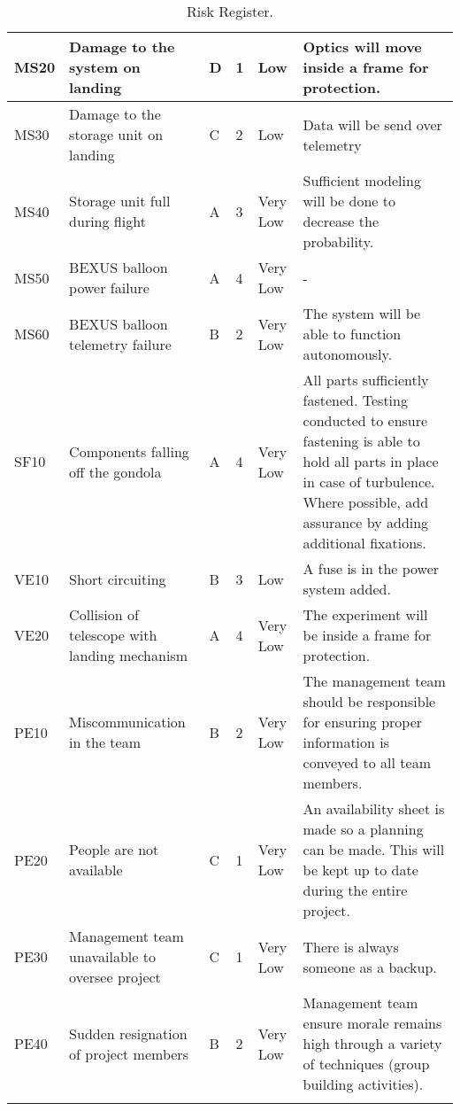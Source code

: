 \begin{longtable}{|m{}| m{} |m{} |m{}|m{}| m{}|}
MS20 & Damage to the system on landing										& D & 1 & \cellcolor[HTML]{FCFF2F}Low			& Optics will move inside a frame for protection.\\\hline

MS30 & Damage to the storage unit on landing									& C & 2 & \cellcolor[HTML]{FCFF2F}Low			& Data will be send over telemetry\\\hline

MS40 & Storage unit full during flight											& A & 3 & \cellcolor[HTML]{34FF34}Very Low	& Sufficient modeling will be done to decrease the probability.\\\hline

MS50 & BEXUS balloon power failure											& A & 4 & \cellcolor[HTML]{34FF34}Very Low	& -\\\hline

MS60 & BEXUS balloon telemetry failure										& B & 2 & \cellcolor[HTML]{34FF34}Very Low	& The system will be able to function autonomously.\\\hline


SF10 & Components falling off the gondola									& A & 4 & \cellcolor[HTML]{34FF34}Very Low	& All parts sufficiently fastened. Testing conducted to ensure fastening is able to hold all parts in place in case of turbulence. Where possible, add assurance by adding additional fixations.\\\hline


VE10 & Short circuiting														& B & 3 & \cellcolor[HTML]{FCFF2F}Low			& A fuse is in the power system added.\\\hline

VE20 & Collision of telescope with landing mechanism						& A & 4 & \cellcolor[HTML]{34FF34}Very Low	& The experiment will be inside a frame for protection.\\\hline


PE10 & Miscommunication in the team											& B & 2 & \cellcolor[HTML]{34FF34}Very Low	& The management team should be responsible for ensuring proper information is conveyed to all team members.\\\hline

PE20 & People are not available												& C & 1 & \cellcolor[HTML]{34FF34}Very Low	& An availability sheet is made so a planning can be made. This will be kept up to date during the entire project.\\\hline

PE30 & Management team unavailable to oversee project						& C & 1 & \cellcolor[HTML]{34FF34}Very Low	& There is always someone as a backup.\\\hline

PE40 & Sudden resignation of project members								& B & 2 & \cellcolor[HTML]{34FF34}Very Low	& Management team ensure morale remains high through a variety of techniques (group building activities).\\\hline




\caption{Risk Register.}
\label{tab:risk-register}
\end{longtable}
\raggedbottom